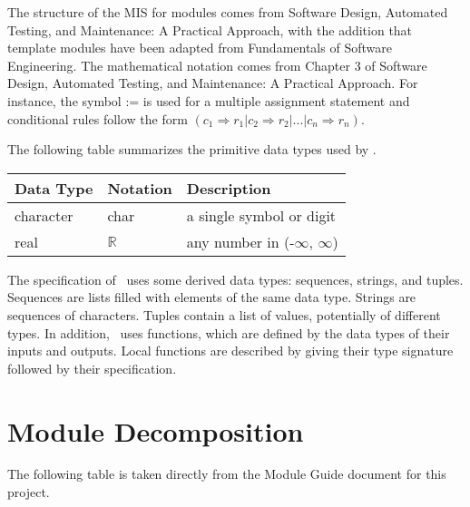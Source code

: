 \documentclass[12pt, titlepage]{article}
\begin{document}
The structure of the MIS for modules comes from Software Design, Automated Testing, and Maintenance: A Practical Approach,
with the addition that template modules have been adapted from
Fundamentals of Software Engineering.  The mathematical notation comes from Chapter 3 of 
Software Design, Automated Testing, and Maintenance: A Practical Approach.  For instance, the symbol := is used for a
multiple assignment statement and conditional rules follow the form $(c_1
\Rightarrow r_1 | c_2 \Rightarrow r_2 | ... | c_n \Rightarrow r_n )$.

The following table summarizes the primitive data types used by \progname. 

\begin{center}
\renewcommand{\arraystretch}{1.2}
\noindent 
\begin{tabular}{l l p{7.5cm}} 
\toprule 
\textbf{Data Type} & \textbf{Notation} & \textbf{Description}\\ 
\midrule
character & char & a single symbol or digit\\
real & $\mathbb{R}$ & any number in (-$\infty$, $\infty$)\\
\bottomrule
\end{tabular} 
\end{center}

\noindent
The specification of \progname \ uses some derived data types: sequences, strings, and
tuples. Sequences are lists filled with elements of the same data type. Strings
are sequences of characters. Tuples contain a list of values, potentially of
different types. In addition, \progname \ uses functions, which
are defined by the data types of their inputs and outputs. Local functions are
described by giving their type signature followed by their specification.

\section{Module Decomposition}

The following table is taken directly from the Module Guide document for this project.
\end{document}
